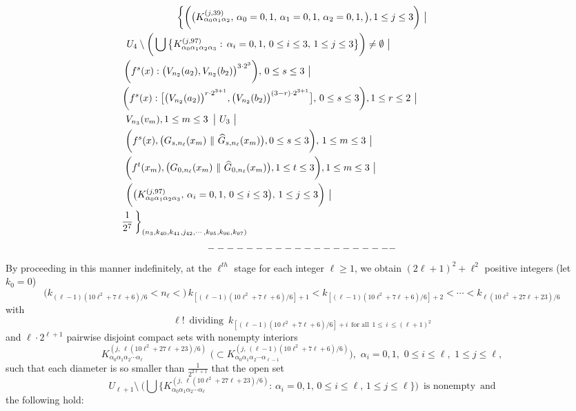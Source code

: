 \documentclass[12pt]{article}
\newcommand{\al}{\alpha}
\begin{document}
\begin{multline*}
$$
\bigg\{ \bigg(\big(K_{\al_0\al_1\al_2}^{(j,39)}, \, \al_0 = 0, 1, \, \al_1 = 0, 1, \, \al_2 = 0, 1, \big), 1 \le j \le 3 \bigg) \,\, \big| \\ 
\,U_4 \setminus \bigg( \bigcup \big\{ K_{\al_0\al_1\al_2\al_3}^{(j,97)}: \, \al_i = 0, 1, \, 0 \le i \le 3, \, 1 \le j \le 3 \big\} \bigg) \ne \emptyset \,\, \big| \qquad \qquad\qquad\quad\quad\,\,\,\,\,\,\, \\ 
\quad\quad \bigg(f^s(x) : \big(V_{n_2}(a_2), V_{n_2}(b_2)\big)^{3 \cdot 2^3}\bigg), \, 0 \le s \le 3 \,\, \big| \qquad\qquad\qquad\qquad\qquad\qquad\qquad\qquad\qquad\quad\,\,\, \\
\,\, \bigg(f^s(x) : \big[\big(V_{n_2}(a_2)\big)^{r \cdot 2^{3+1}}, \big(V_{n_2}(b_2)\big)^{(3-r) \cdot 2^{3+1}}\big], \, 0 \le s \le 3\bigg), 1 \le r \le 2 \,\, \big| \qquad\qquad\quad\quad\,\,\,\,\,\, \\  
\, V_{n_3}(v_m), 1 \le m \le 3 \,\,\, \big| \,\, U_3 \,\, \big| \,\qquad\qquad\qquad\qquad\qquad\qquad\qquad\qquad\qquad\qquad\qquad\qquad\quad \\
\,\,\,\bigg(f^{s}(x), \big(G_{s,n_\ell}(x_m) \,\, \| \,\, \widehat G_{s,n_\ell}(x_m)\big), 0 \le s \le 3\bigg), \, 1 \le m \le 3 \,\, \big| \qquad\qquad\qquad\qquad\qquad\quad\,\,\, \\ 
\,\,\bigg(f^t(x_m), \big(G_{0,n_\ell}(x_m) \,\, \| \,\, \widehat G_{0,n_\ell}(x_m)\big), 1 \le t \le 3 \bigg), 1 \le m \le 3 \,\, \big| \qquad\qquad\qquad\qquad\qquad\quad \\ 
\,\,\,\,\, \bigg(\big(K_{\al_0\al_1\al_2\al_3}^{(j,97)}, \, \al_i = 0,1, \, 0 \le i \le 3 \big), \, 1 \le j \le 3\bigg) \,\, \big| \qquad\qquad\qquad\qquad\qquad\qquad\qquad\qquad \\
\frac 1{2^7} \, \bigg\}_{(n_3, k_{40}, k_{41}, j_{42}, \cdots, k_{95}, k_{96}, k_{97})} \quad\quad\,\,\qquad\qquad\qquad\qquad\qquad\qquad\qquad\qquad\qquad\qquad\qquad
\end{multline*}
$$--------------------\vspace{.1in}$$
\indent By proceeding in this manner indefinitely, at the $\ell^{th}$ stage for each integer $\ell \ge 1$, we obtain $(2\ell+1)^2+\ell^2$ positive integers (let $k_0 = 0$)
$$
\big(k_{(\ell-1)(10\ell^2+7\ell+6)/6} < n_\ell <\big) \, k_{[(\ell-1)(10\ell^2+7\ell+6)/6]+1} < k_{[(\ell-1)(10\ell^2+7\ell+6)/6]+2} < \cdots < k_{\ell(10\ell^2+27\ell+23)/6}
$$ 
with 
$$
{\ell}! \,\,\, \text{dividing} \,\,\, k_{[(\ell-1)(10\ell^2+7\ell+6)/6]+i \,\,\, \text{for all} \,\,\, 1 \le \, i \, \le (\ell+1)^2} 
$$ 
and $\ell \cdot 2^{\ell+1}$ pairwise disjoint compact sets with nonempty interiors
$$
K_{\al_0\al_1\al_2\cdots \al_\ell}^{(j, \,\ell(10\ell^2+27\ell+23)/6)} \,\, \big(\subset K_{\al_0\al_1\al_2\cdots \al_{\ell-1}}^{(j,\, (\ell-1)(10\ell^2+7\ell+6)/6)}\big), \,\, \al_i = 0, 1, \,\, 0 \le i \le \ell, \,\, 1 \le j \le \ell,
$$ 
such that each diameter is so smaller than $\frac 1{2^{2\ell+1}}$ that the open set 
$$
U_{\ell+1} \setminus \ \bigg( \bigcup \big\{ K_{\al_0\al_1\al_2\cdots \al_\ell}^{(j,\,\ell(10\ell^2+27\ell+23)/6)}: \, \al_i = 0, 1, \, 0 \le i \le \ell, \, 1 \le j \le \ell \big\} \bigg) \,\,\, \text{is nonempty} \,\,\, \text{and}
$$
the following hold:
\end{document}
